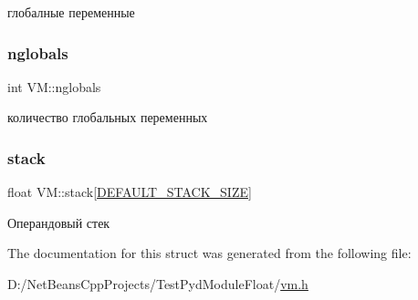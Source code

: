 глобалные переменные \mbox{\label{struct_v_m_a68946a4843ec05f3c865d177fa982dbe}} 
\subsubsection{\texorpdfstring{nglobals}{nglobals}}
{\footnotesize\ttfamily int V\+M\+::nglobals}

количество глобальных переменных \mbox{\label{struct_v_m_a1ff291de0c5c28fa61abf17fa9a90fcd}} 
\subsubsection{\texorpdfstring{stack}{stack}}
{\footnotesize\ttfamily float V\+M\+::stack\mbox{[}\hyperlink{vm_8h_a87dcbc4991a2a2fc4eb6fc6a24449f26}{D\+E\+F\+A\+U\+L\+T\+\_\+\+S\+T\+A\+C\+K\+\_\+\+S\+I\+ZE}\mbox{]}}

Операндовый стек 

The documentation for this struct was generated from the following file\+:\begin{DoxyCompactItemize}
\item 
D\+:/\+Net\+Beans\+Cpp\+Projects/\+Test\+Pyd\+Module\+Float/\hyperlink{vm_8h}{vm.\+h}\end{DoxyCompactItemize}
